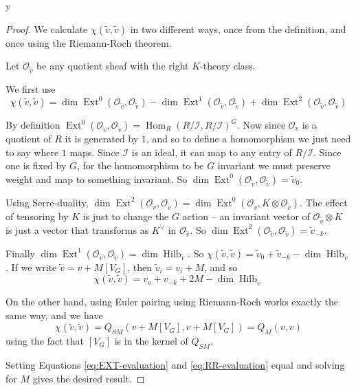 y\documentclass{amsart}[12pt]
\theoremstyle{definition}
\newcommand{\OO}{\mathcal{O}}
\DeclareMathOperator{\Hilb}{Hilb}
\DeclareMathOperator{\Ext}{Ext}
\DeclareMathOperator{\Hom}{Hom}
\begin{document}
\begin{proof}
We calculate $\chi(\tilde{v},\tilde{v})$ in two different ways, once from the definition, and once using the Riemann-Roch theorem.

Let $\OO_{\tilde{v}}$ be any quotient sheaf with the right $K$-theory class.  

We first use
$$\chi(\tilde{v}, \tilde{v})=\dim\Ext^0(\OO_{\tilde{v}},\OO_{\tilde{v}})-\dim\Ext^1(\OO_{\tilde{v}},\OO_{\tilde{v}})+\dim\Ext^2(\OO_{\tilde{v}},\OO_{\tilde{v}})$$

By definition $\Ext^0(\OO_{\tilde{v}},\OO_{\tilde{v}})=\Hom_R(R/\mathcal{I},R/\mathcal{I})^G$.  Now since $\OO_v$ is a quotient of $R$ it is generated by $1$, and so to define a homomorphism we just need to say where $1$ maps. Since $\mathcal{I}$ is an ideal, it can map to any entry of $R/\mathcal{I}$.  Since one is fixed by $G$, for the homomorphism to be $G$ invariant we must preserve weight and map to something invariant.  So $\dim\Ext^0(\OO_{\tilde{v}},\OO_{\tilde{v}})=\tilde{v}_0$.  

Using Serre-duality, $\dim\Ext^2(\OO_{\tilde{v}},\OO_{\tilde{v}})=\dim\Ext^0(\OO_{\tilde{v}},K\otimes\OO_{\tilde{v}})$.  The effect of tensoring by $K$ is just to change the $G$ action -- an invariant vector of $\OO_{\tilde{v}}\otimes K$ is just a vector that transforms as $K^\vee$ in $\OO_{\tilde{v}}$.  
So $\dim\Ext^2(\OO_{\tilde{v}},\OO_{\tilde{v}})=\tilde{v}_{-k}$.  

Finally $\dim\Ext^1(\OO_{\tilde{v}},\OO_{\tilde{v}})=\dim\Hilb_{\tilde{v}}$.  So $\chi(\tilde{v},\tilde{v})=\tilde{v}_0+\tilde{v}_{-k}-\dim\Hilb_{\tilde{v}}$.  If we write $\tilde{v}=v+M [V_G]$, then $\tilde{v}_i=v_i+M$, and so  
\begin{equation} \label{eq:EXT-evaluation}
\chi(\tilde{v},\tilde{v})=v_o+v_{-k}+2M-\dim\Hilb_{\tilde{v}} 
\end{equation}

On the other hand, using Euler pairing using Riemann-Roch works exactly the same way, and we have
\begin{equation} \label{eq:RR-evaluation}
\chi(\tilde{v},\tilde{v})=Q_{SM}(v+M[V_G],v+M[V_G])=Q_M(v,v)
\end{equation}
using the fact that $[V_G]$ is in the kernel of $Q_{SM}$.  

Setting Equations \ref{eq:EXT-evaluation} and \ref{eq:RR-evaluation} equal and solving for $M$ gives the desired result.

\end{proof}
\end{document}
